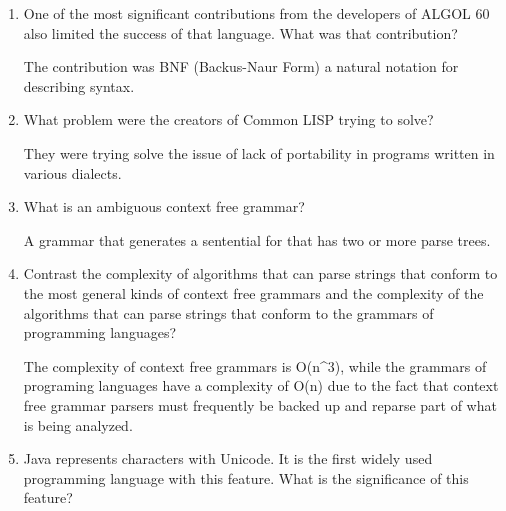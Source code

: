\begin{enumerate}
\begin{answer}
    \end{answer}


  \item One of the most significant contributions from the developers
    of ALGOL 60 also limited the success of that language. What was
    that contribution?

  \begin{answer}

  The contribution was BNF (Backus-Naur Form) a natural notation for describing syntax.

    \end{answer}

  \item What problem were the creators of Common LISP trying to solve?

  \begin{answer}

    They were trying solve the issue of lack of portability in programs written in various dialects.

    \end{answer}

  \item What is an ambiguous context free grammar?

  \begin{answer}

   A grammar that generates a sentential for that has two or more parse trees.

    \end{answer}

  \item Contrast the complexity of algorithms that can parse strings
    that conform to the most general kinds of context free grammars
    and the complexity of the algorithms that can parse strings that
    conform to the grammars of programming languages?

  \begin{answer}

    The complexity of context free grammars is O(n^3), while the grammars of programing languages have a complexity of O(n) due to the fact that context free grammar parsers must frequently be backed up and reparse part of what is being analyzed.

    \end{answer}

  \item Java represents characters with Unicode. It is the first
    widely used programming language with this feature. What is the
    significance of this feature?


\end{enumerate}
